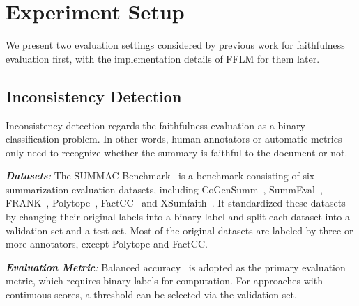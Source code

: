 \section{Experiment Setup}
\label{sec:experiment}



We present two evaluation settings considered by previous work for faithfulness evaluation first, with the implementation details of FFLM for them later.

\subsection{Inconsistency Detection}

Inconsistency detection regards the faithfulness evaluation as a binary classification problem. 
In other words, human annotators or automatic metrics only need to recognize whether the summary is faithful to the document or not.

\textit{\textbf{Datasets}:} The SUMMAC Benchmark~\cite{laban2022summac} is a benchmark consisting of six summarization evaluation datasets, including CoGenSumm~\citet{falke2019ranking}, SummEval~\cite{fabbri2021summeval}, FRANK~\cite{pagnoni2021understanding}, Polytope~\cite{huang2020have}, FactCC~\cite{kryscinski2020evaluating} and XSumfaith~\cite{maynez2020faithfulness}. It standardized these datasets by changing their original labels into a binary label and split each dataset into a validation set and a test set. Most of the original datasets are labeled by three or more annotators, except Polytope and FactCC.

\textit{\textbf{Evaluation Metric}:} Balanced accuracy~\cite{brodersen2010balanced} is adopted as the primary evaluation metric, which requires binary labels for computation. For approaches with continuous scores, a threshold can be selected via the validation set.

